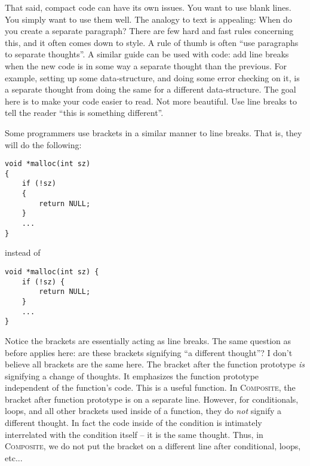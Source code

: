 \documentclass[11pt,onecolumn]{article}
\def\composite{\textsc{Composite}}
\newcommand{\head}[1]{\vspace{0.4em}\noindent{\bf #1}}
\begin{document}
That said, compact code can have its own issues.  You want to use
blank lines.  You simply want to use them well.  The analogy to text
is appealing: When do you create a separate paragraph?  There are few
hard and fast rules concerning this, and it often comes down to style.
A rule of thumb is often ``use paragraphs to separate thoughts''.  A
similar guide can be used with code: add line breaks when the new code
is in some way a separate thought than the previous.  For example,
setting up some data-structure, and doing some error checking on it,
is a separate thought from doing the same for a different
data-structure.  The goal here is to make your code easier to read.
Not more beautiful.  Use line breaks to tell the reader ``this is
something different''.

\head{On using brackets as line breaks.}  Some programmers use
brackets in a similar manner to line breaks.  That is, they will do
the following:

    \begin{minipage}{3in}
      \footnotesize
      \lstset{language=C}
      \begin{lstlisting}
void *malloc(int sz)
{
    if (!sz)
    {
        return NULL;
    }
    ...
}
      \end{lstlisting}
    \end{minipage}

instead of 

    \begin{minipage}{3in}
      \footnotesize
      \lstset{language=C}
      \begin{lstlisting}
void *malloc(int sz) {
    if (!sz) {
        return NULL;
    }
    ...
}
      \end{lstlisting}
    \end{minipage}

Notice the brackets are essentially acting as line breaks.  The same
question as before applies here: are these brackets signifying ``a
different thought''?  I don't believe all brackets are the same here.
The bracket after the function prototype {\em is} signifying a change
of thoughts.  It emphasizes the function prototype independent of the
function's code.  This is a useful function.  In \composite , the
bracket after function prototype is on a separate line.  However, for
conditionals, loops, and all other brackets used inside of a function,
they do {\em not} signify a different thought.  In fact the code
inside of the condition is intimately interrelated with the condition
itself -- it is the same thought.  Thus, in \composite , we do not put
the bracket on a different line after conditional, loops, etc...
\end{document}
